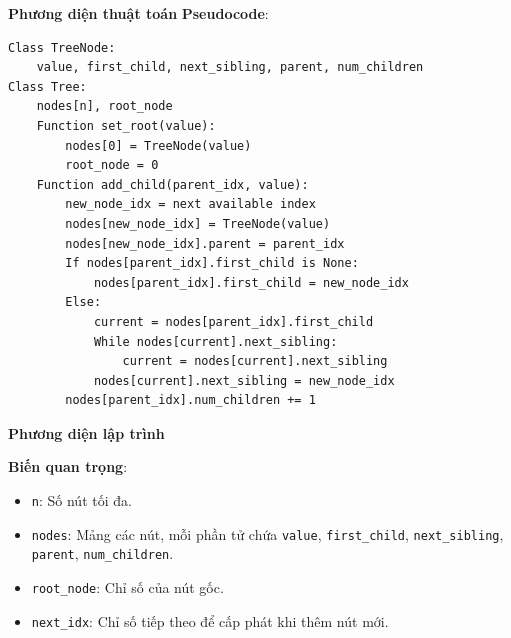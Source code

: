 \documentclass[a4paper,12pt]{article}
\begin{document}
\textbf{Phương diện thuật toán}
\textbf{Pseudocode}:
\begin{verbatim}
Class TreeNode:
    value, first_child, next_sibling, parent, num_children
Class Tree:
    nodes[n], root_node
    Function set_root(value):
        nodes[0] = TreeNode(value)
        root_node = 0
    Function add_child(parent_idx, value):
        new_node_idx = next available index
        nodes[new_node_idx] = TreeNode(value)
        nodes[new_node_idx].parent = parent_idx
        If nodes[parent_idx].first_child is None:
            nodes[parent_idx].first_child = new_node_idx
        Else:
            current = nodes[parent_idx].first_child
            While nodes[current].next_sibling:
                current = nodes[current].next_sibling
            nodes[current].next_sibling = new_node_idx
        nodes[parent_idx].num_children += 1
\end{verbatim}

\textbf{Phương diện lập trình}

\textbf{Biến quan trọng}:
\begin{itemize}
    \item \texttt{n}: Số nút tối đa.
    \item \texttt{nodes}: Mảng các nút, mỗi phần tử chứa \texttt{value}, \texttt{first\_child}, \texttt{next\_sibling}, \texttt{parent}, \texttt{num\_children}.
    \item \texttt{root\_node}: Chỉ số của nút gốc.
    \item \texttt{next\_idx}: Chỉ số tiếp theo để cấp phát khi thêm nút mới.
\end{itemize}
\end{document}
